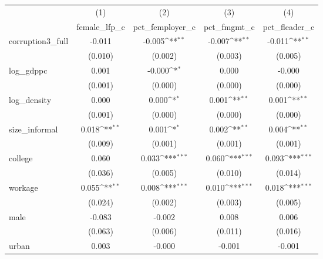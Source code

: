 {
\def\sym#1{\ifmmode^{#1}\else\(^{#1}\)\fi}
\begin{tabular}{l*{4}{c}}
\hline\hline
            &\multicolumn{1}{c}{(1)}&\multicolumn{1}{c}{(2)}&\multicolumn{1}{c}{(3)}&\multicolumn{1}{c}{(4)}\\
            &\multicolumn{1}{c}{female\_lfp\_c}&\multicolumn{1}{c}{pct\_femployer\_c}&\multicolumn{1}{c}{pct\_fmgmt\_c}&\multicolumn{1}{c}{pct\_fleader\_c}\\
\hline
corruption3\_full&      -0.011         &      -0.005\sym{**} &      -0.007\sym{**} &      -0.011\sym{**} \\
            &     (0.010)         &     (0.002)         &     (0.003)         &     (0.005)         \\
[1em]
log\_gdppc   &       0.001         &      -0.000\sym{*}  &       0.000         &      -0.000         \\
            &     (0.001)         &     (0.000)         &     (0.000)         &     (0.000)         \\
[1em]
log\_density &       0.000         &       0.000\sym{*}  &       0.001\sym{**} &       0.001\sym{**} \\
            &     (0.001)         &     (0.000)         &     (0.000)         &     (0.000)         \\
[1em]
size\_informal&       0.018\sym{**} &       0.001\sym{*}  &       0.002\sym{**} &       0.004\sym{**} \\
            &     (0.009)         &     (0.001)         &     (0.001)         &     (0.001)         \\
[1em]
college     &       0.060         &       0.033\sym{***}&       0.060\sym{***}&       0.093\sym{***}\\
            &     (0.036)         &     (0.005)         &     (0.010)         &     (0.014)         \\
[1em]
workage     &       0.055\sym{**} &       0.008\sym{***}&       0.010\sym{***}&       0.018\sym{***}\\
            &     (0.024)         &     (0.002)         &     (0.003)         &     (0.005)         \\
[1em]
male        &      -0.083         &      -0.002         &       0.008         &       0.006         \\
            &     (0.063)         &     (0.006)         &     (0.011)         &     (0.016)         \\
[1em]
urban       &       0.003         &      -0.000         &      -0.001         &      -0.001         \\

\end{tabular}}
